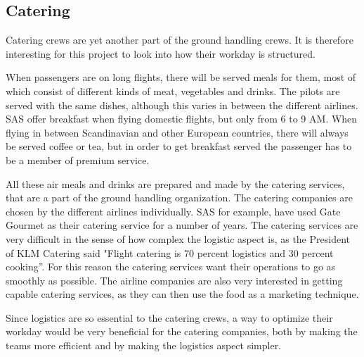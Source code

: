 \subsection{Catering} 
Catering crews are yet another part of the ground handling crews. It is therefore interesting for this project to look into how their workday is structured.

When passengers are on long flights, there will be served meals for them, most of which consist of different kinds of meat, vegetables and drinks. The pilots are served with the same dishes, although this varies in between the different airlines\cite{cate_pilotfood1}\cite{cate_pilotfood2}. SAS offer breakfast when flying domestic flights, but only from 6 to 9 AM\cite{cate_SASIndri}. When flying in between Scandinavian and other European countries, there will always be served coffee or tea, but in order to get breakfast served the passenger has to be a member of premium service\cite{cate_SASscanda}.

All these air meals and drinks are prepared and made by the catering services, that are a part of the ground handling organization. The catering companies are chosen by the different airlines individually. SAS for example, have used Gate Gourmet\cite{cate_SASGourmet} as their catering service for a number of years. The catering services are very difficult in the sense of how complex the logistic aspect is, as the President of KLM Catering said "Flight catering is 70 
percent logistics and 30 percent cooking”\cite{cate_BookSection}. For this reason the catering services want their operations to go as smoothly as possible. The airline companies are also very interested in getting capable catering services, as they can then use the food as a marketing technique\cite{cate_BookSection}. 

Since logistics are so essential to the catering crews, a way to optimize their workday would be very beneficial for the catering companies, both by making the teams more efficient and by making the logistics aspect simpler.